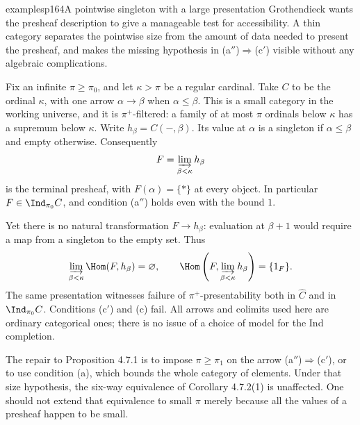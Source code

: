 \begin{dcomment}{examples}{p164}{A pointwise singleton with a large presentation}
Grothendieck wants the presheaf description to give a manageable test for accessibility. A thin category separates the pointwise size from the amount of data needed to present the presheaf, and makes the missing hypothesis in (a$''$)$\Rightarrow$(c$'$) visible without any algebraic complications.

Fix an infinite $\pi\geq\pi_0$, and let $\kappa>\pi$ be a regular cardinal. Take $C$ to be the ordinal $\kappa$, with one arrow $\alpha\to\beta$ when $\alpha\leq\beta$. This is a small category in the working universe, and it is $\pi^+$-filtered: a family of at most $\pi$ ordinals below $\kappa$ has a supremum below $\kappa$. Write $h_\beta=C(-,\beta)$. Its value at $\alpha$ is a singleton if $\alpha\leq\beta$ and empty otherwise. Consequently
\[
 F=\varinjlim_{\beta<\kappa}h_\beta
\]
is the terminal presheaf, with $F(\alpha)=\{*\}$ at every object. In particular $F\in\Ind_{\pi_0}C$, and condition (a$''$) holds even with the bound $1$.

Yet there is no natural transformation $F\to h_\beta$: evaluation at $\beta+1$ would require a map from a singleton to the empty set. Thus
\[
 \varinjlim_{\beta<\kappa}\Hom(F,h_\beta)=\varnothing,
 \qquad
 \Hom\left(F,\varinjlim_{\beta<\kappa}h_\beta\right)=\{1_F\}.
\]
The same presentation witnesses failure of $\pi^+$-presentability both in $\widehat C$ and in $\Ind_{\pi_0}C$. Conditions (c$'$) and (c) fail. All arrows and colimits used here are ordinary categorical ones; there is no issue of a choice of model for the Ind completion.

The repair to Proposition 4.7.1 is to impose $\pi\geq\pi_1$ on the arrow (a$''$)$\Rightarrow$(c$'$), or to use condition (a), which bounds the whole category of elements. Under that size hypothesis, the six-way equivalence of Corollary 4.7.2(1) is unaffected. One should not extend that equivalence to small $\pi$ merely because all the values of a presheaf happen to be small.
\end{dcomment}

